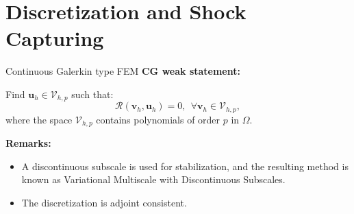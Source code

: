 \documentclass{beamer}
\newcounter{sectionframes}
\newcommand{\setsectionframes}[1]{%
  \setcounter{sectionframes}{#1}%
}
\newcounter{sectionframecount}
\begin{document}
\section{Discretization and Shock Capturing}

\setsectionframes{6}


\begin{frame}[t]{Continuous Galerkin type FEM}
  \textbf{CG weak statement:}

  \vspace{10pt}
  Find $\boldsymbol{u}_{h} \in \mathcal{V}_{h,p}$ such that:
  \begin{equation}
    \mathcal{R}(\boldsymbol{v}_{h},\boldsymbol{u}_{h}) = 0,~~\forall \boldsymbol{v}_{h} \in \mathcal{V}_{h,p},
    \label{e:multiscale_weak_statement}
  \end{equation}
  where the space $\mathcal{V}_{h,p}$ contains polynomials of order $p$ in $\Omega$.

  \vspace{10pt}
  \textbf{Remarks:}
  \begin{itemize}
    \item A discontinuous subscale is used for stabilization, and the resulting method is known as Variational Multiscale with Discontinuous Subscales.
    \item The discretization is adjoint consistent.
  \end{itemize}
\end{frame}

\end{document}
